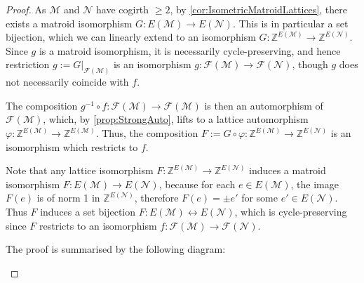\documentclass[12pt]{report}
\theoremstyle{definition}
\def\Z{\mathbb Z}
\def\calF{\mathcal F}
\def\calM{\mathcal M}
\def\calN{\mathcal N}
\theoremstyle{upright}
\begin{document}
\begin{proof}

    As $\calM$ and $\calN$ have cogirth $\geq2$, by \cref{cor:IsometricMatroidLattices}, there exists a matroid isomorphism $G:E(\calM)\to E(\calN)$.
    This is in particular a set bijection, which we can linearly extend to an isomorphism $G:\Z^{E(\calM)}\to\Z^{E(\calN)}$.
    Since $g$ is a matroid isomorphism, it is necessarily cycle-preserving, and hence restriction $g:=G|_{\calF(\calM)}$ is an isomorphism $g:\calF(\calM)\to\calF(\calN)$, though $g$ does not necessarily coincide with $f$.
    
    The composition $g^{-1}\circ f:\calF(\calM)\to\calF(\calM)$ is then an automorphism of $\calF(\calM)$, which, by \cref{prop:StrongAuto}, lifts to a lattice automorphism $\varphi:\Z^{E(\calM)}\to\Z^{E(\calM)}$. 
    Thus, the composition $F:=G\circ\varphi:\Z^{E(\calM)}\to\Z^{E(\calN)}$ is an isomorphism which restricts to $f$.
    
    Note that any lattice isomorphism $F:\Z^{E(\calM)}\to\Z^{E(\calN)}$ induces a matroid isomorphism $F:E(\calM)\to E(\calN)$, because for each $e\in E(\calM)$, the image $F(e)$ is of norm 1 in $\Z^{E(\calN)}$, therefore $F(e)=\pm e'$ for some $e'\in E(\calN)$. Thus $F$ induces a set bijection $F:E(\calM)\leftrightarrow E(\calN)$, which is cycle-preserving since $F$ restricts to an isomorphism $f:\calF(\calM)\to\calF(\calN)$.
    
    The proof is summarised by the following diagram:
    \begin{center}
    
        
    \end{center}

\end{proof}
\end{document}
